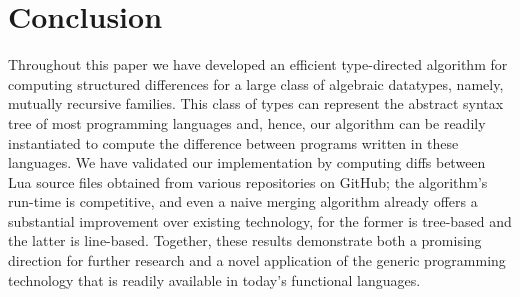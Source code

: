\section{Conclusion}
Throughout this paper we have developed an efficient type-directed algorithm for computing structured differences for a large class of algebraic datatypes, namely, mutually recursive families. This class of types can represent the abstract syntax tree of most programming languages and, hence, our algorithm can be readily instantiated to compute the difference between programs written in these languages. We have validated our implementation by computing diffs between Lua source files obtained from various repositories on GitHub; the algorithm's run-time is competitive, and even a naive merging algorithm already offers a substantial improvement over existing technology, for the former is tree-based and the latter is line-based. Together, these results demonstrate both a promising direction for further research and a novel application of the generic programming technology that is readily available in today's functional languages.